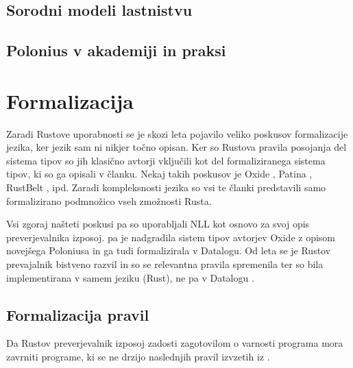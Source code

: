 \documentclass[a4paper,12pt,openright]{book}
\begin{document}
\section{Sorodni modeli lastnistvu}

\section{Polonius v akademiji in praksi}

\chapter{Formalizacija}
Zaradi Rustove uporabnosti se je skozi leta pojavilo veliko poskusov formalizacije jezika, ker jezik sam
ni nikjer točno opisan. Ker so Rustova pravila posojanja del sistema tipov so jih klasično avtorji
vključili kot del formaliziranega sistema tipov, ki so ga opisali v članku. Nekaj takih poskusov je Oxide \cite{weissOxideEssenceRust2019},
Patina \cite{reedPatinaFormalizationRust}, RustBelt \cite{jungRustBeltSecuringFoundations2018}, ipd.
Zaradi kompleksnosti jezika so vsi te članki predstavili samo formalizirano podmnožico vseh
zmožnosti Rusta.

Vsi zgoraj našteti poskusi pa so uporabljali NLL kot osnovo za svoj opis preverjevalnika izposoj.
\citeauthor{stjernaModellingRustsReference} pa je nadgradila sistem tipov avtorjev Oxide z opisom
novejšega Poloniusa in ga tudi formalizirala v Datalogu. Od leta \citeyear{stjernaModellingRustsReference} se
je Rustov prevajalnik bistveno razvil in so se relevantna pravila spremenila ter so bila implementirana
v samem jeziku (Rust), ne pa v Datalogu \cite{RustCompilerRustc_borrowck}.

\section{Formalizacija pravil}
Da Rustov preverjevalnik izposoj zadosti zagotovilom o varnosti programa mora zavrniti programe,
ki se ne drzijo naslednjih pravil izvzetih iz \cite{stjernaModellingRustsReference}.
\end{document}
